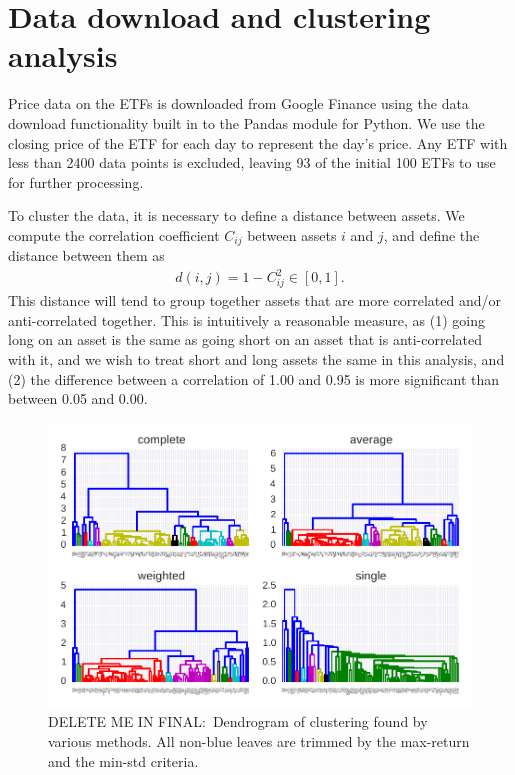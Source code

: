 \section{Data download and clustering analysis}

Price data on the ETFs is downloaded from Google Finance using the data download functionality built in to the Pandas module for Python.
We use the closing price of the ETF for each day to represent the day's price.
Any ETF with less than 2400 data points is excluded, leaving 93 of the initial 100 ETFs to use for further processing.

To cluster the data, it is necessary to define a distance between assets. We compute the correlation coefficient $C_{ij}$ between assets $i$ and $j$, and define the distance between them as
\begin{gather}
d(i,j) = 1 - C_{ij}^2  \in [0, 1].
\end{gather}
This distance will tend to group together assets that are more correlated and/or anti-correlated together.
This is intuitively a reasonable measure, as (1) going long on an asset is the same as going short on an asset that is anti-correlated with it, and we wish to treat short and long assets the same in this analysis, and (2) the difference between a correlation of 1.00 and 0.95 is more significant than between 0.05 and 0.00.


\begin{figure}[tp]
\centering
\includegraphics{pic/dendro_methods.pdf}
\caption{DELETE ME IN FINAL:\ Dendrogram of clustering found by various methods. All non-blue leaves are trimmed by the max-return and the min-std criteria.}
\label{fig:bondsyield}
\end{figure}

